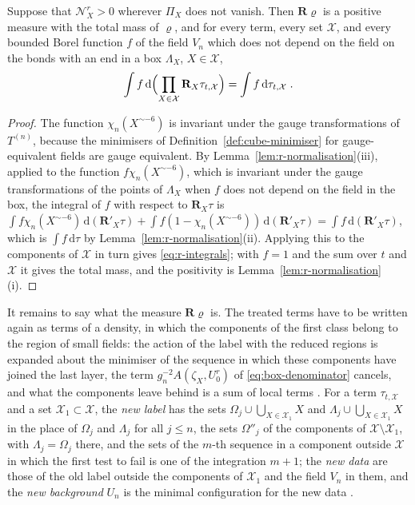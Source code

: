 \documentclass[11pt]{preprint}
\newcommand{\dd}{\mathrm{d}}
\numberwithin{equation}{section}
\begin{document}
\begin{lemma}\label{lem:r-integrals}
Suppose that $\mathcal N^r_X > 0$ wherever $\Pi_X$ does not vanish. Then $\mathbf R\varrho$ is a positive measure with the total mass of $\varrho$, and for every term, every set $\mathcal X$, and every bounded Borel function $f$ of the field $V_n$ which does not depend on the field on the bonds with an end in a box $\Lambda_X$, $X \in \mathcal X$,
\begin{equation}\label{eq:r-integrals}
    \int f\,\dd\Bigl(\prod_{X \in \mathcal X}\mathbf R_X\tau_{t,\mathcal X}\Bigr) = \int f\,\dd\tau_{t,\mathcal X}\;.
\end{equation}
\end{lemma}

\begin{proof}
The function $\chi_n(X^{\sim-6})$ is invariant under the gauge transformations of $T^{(n)}$, because the minimisers of Definition~\ref{def:cube-minimiser} for gauge-equivalent fields are gauge equivalent. By Lemma~\ref{lem:r-normalisation}(iii), applied to the function $f\chi_n(X^{\sim-6})$, which is invariant under the gauge transformations of the points of $\Lambda_X$ when $f$ does not depend on the field in the box, the integral of $f$ with respect to $\mathbf R_X\tau$ is $\int f\chi_n(X^{\sim-6})\,\dd(\mathbf R'_X\tau) + \int f(1 - \chi_n(X^{\sim-6}))\,\dd(\mathbf R'_X\tau) = \int f\,\dd(\mathbf R'_X\tau)$, which is $\int f\,\dd\tau$ by Lemma~\ref{lem:r-normalisation}(ii). Applying this to the components of $\mathcal X$ in turn gives \eqref{eq:r-integrals}; with $f = 1$ and the sum over $t$ and $\mathcal X$ it gives the total mass, and the positivity is Lemma~\ref{lem:r-normalisation}(i).
\end{proof}

It remains to say what the measure $\mathbf R\varrho$ is. The treated terms have to be written again as terms of a density, in which the components of the first class belong to the region of small fields: the action of the label with the reduced regions is expanded about the minimiser of the sequence in which these components have joined the last layer, the term $g_n^{-2}A(\zeta_X, U^r_0)$ of \eqref{eq:box-denominator} cancels, and what the components leave behind is a sum of local terms \cite[(1.14)--(1.70)]{BalabanLFR2}. For a term $\tau_{t,\mathcal X}$ and a set $\mathcal X_1 \subset \mathcal X$, the \emph{new label} has the sets $\Omega_j \cup \bigcup_{X \in \mathcal X_1}X$ and $\Lambda_j \cup \bigcup_{X \in \mathcal X_1}X$ in the place of $\Omega_j$ and $\Lambda_j$ for all $j \leqslant n$, the sets $\Omega''_j$ of the components of $\mathcal X \setminus \mathcal X_1$, with $\Lambda_j = \Omega_j$ there, and the sets of the $m$-th sequence in a component outside $\mathcal X$ in which the first test to fail is one of the integration $m + 1$; the \emph{new data} are those of the old label outside the components of $\mathcal X_1$ and the field $V_n$ in them, and the \emph{new background} $U_n$ is the minimal configuration for the new data \cite[(1.33)--(1.35)]{BalabanLFR2}.
\end{document}

